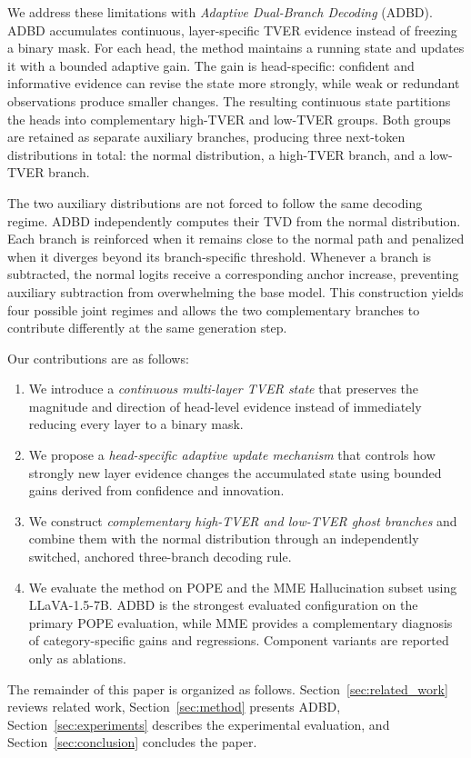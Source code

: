 We address these limitations with \emph{Adaptive Dual-Branch Decoding} (ADBD). ADBD accumulates continuous, layer-specific TVER evidence instead of freezing a binary mask. For each head, the method maintains a running state and updates it with a bounded adaptive gain. The gain is head-specific: confident and informative evidence can revise the state more strongly, while weak or redundant observations produce smaller changes. The resulting continuous state partitions the heads into complementary high-TVER and low-TVER groups. Both groups are retained as separate auxiliary branches, producing three next-token distributions in total: the normal distribution, a high-TVER branch, and a low-TVER branch.

The two auxiliary distributions are not forced to follow the same decoding regime. ADBD independently computes their TVD from the normal distribution. Each branch is reinforced when it remains close to the normal path and penalized when it diverges beyond its branch-specific threshold. Whenever a branch is subtracted, the normal logits receive a corresponding anchor increase, preventing auxiliary subtraction from overwhelming the base model. This construction yields four possible joint regimes and allows the two complementary branches to contribute differently at the same generation step.

Our contributions are as follows:
\begin{enumerate}
    \item We introduce a \emph{continuous multi-layer TVER state} that preserves the magnitude and direction of head-level evidence instead of immediately reducing every layer to a binary mask.
    \item We propose a \emph{head-specific adaptive update mechanism} that controls how strongly new layer evidence changes the accumulated state using bounded gains derived from confidence and innovation.
    \item We construct \emph{complementary high-TVER and low-TVER ghost branches} and combine them with the normal distribution through an independently switched, anchored three-branch decoding rule.
    \item We evaluate the method on POPE and the MME Hallucination subset using LLaVA-1.5-7B. ADBD is the strongest evaluated configuration on the primary POPE evaluation, while MME provides a complementary diagnosis of category-specific gains and regressions. Component variants are reported only as ablations. 
\end{enumerate}

The remainder of this paper is organized as follows. Section~\ref{sec:related_work} reviews related work, Section~\ref{sec:method} presents ADBD, Section~\ref{sec:experiments} describes the experimental evaluation, and Section~\ref{sec:conclusion} concludes the paper.
